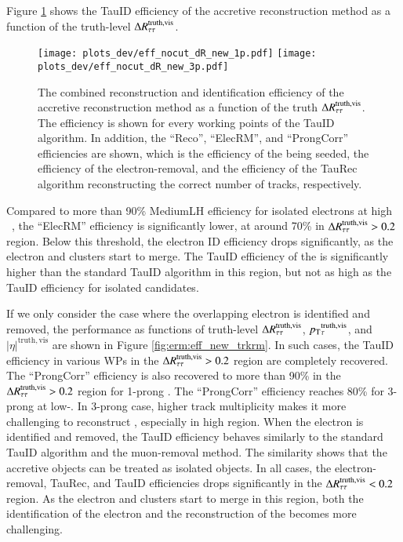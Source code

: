     Figure \ref{fig:erm:eff_dR_erm} shows the TauID efficiency of the accretive \tauhaderm reconstruction method as a function of the truth-level $\Delta R_\mathrm{\tau\tau}^\mathrm{truth, vis}$.
    \begin{figure}[htbp]
        \centering
        \texttt{[image: plots\_dev/eff\_nocut\_dR\_new\_1p.pdf]}
        \texttt{[image: plots\_dev/eff\_nocut\_dR\_new\_3p.pdf]}
        \caption{The combined reconstruction and identification efficiency of the accretive \tauhaderm reconstruction method as a function of the truth $\Delta R_\mathrm{\tau\tau}^\mathrm{truth, vis}$. The
        efficiency is shown for every working points of the TauID algorithm. In addition, the ``Reco'', ``ElecRM'', and ``ProngCorr'' efficiencies are shown, which is the efficiency of the
        \tauhad being seeded, the efficiency of the electron-removal, and the efficiency of the TauRec algorithm reconstructing the correct number of tracks, respectively.}
        \label{fig:erm:eff_dR_erm}
    \end{figure}
    Compared to more than 90\% MediumLH efficiency for isolated electrons at high \pT~\cite{EGAM-2021-01}, 
    the ``ElecRM'' efficiency is significantly lower, at around 70\% in $\Delta R_\mathrm{\tau\tau}^\mathrm{truth, vis} > 0.2$ region. 
    Below this threshold, the electron ID efficiency drops significantly, as the electron and \tauhad clusters start to merge. 
    The TauID efficiency of the \tauhaderm is significantly 
    higher than the standard TauID algorithm in this region,
    but not as high as the TauID efficiency for isolated \tauhad candidates.

    If we only consider the case where the overlapping electron is identified and removed, the performance as functions of truth-level 
    $\Delta R_\mathrm{\tau\tau}^\mathrm{truth, vis}$, $p_{\text{T}}{}_{\tau}^\mathrm{truth,vis}$, and $|\eta|^\mathrm{truth, vis}$ are shown in 
    Figure \ref{fig:erm:eff_new_trkrm}.
    In such cases, the TauID efficiency in various WPs in the $\Delta R_\mathrm{\tau\tau}^\mathrm{truth, vis} > 0.2$ 
    region are completely recovered.
    The ``ProngCorr'' efficiency is also recovered to more than 90\% in the $\Delta R_\mathrm{\tau\tau}^\mathrm{truth, vis} > 0.2$ 
    region for 1-prong \tauhaderm.
    The ``ProngCorr'' efficiency reaches 80\% for 3-prong \tauhaderm at low-\pT. 
    In 3-prong case, higher track multiplicity makes it more challenging to reconstruct \tauhad, especially in high \pT region.
    When the electron is identified and removed, the TauID efficiency
    behaves similarly to the standard TauID algorithm and the muon-removal method. 
    The similarity shows that the accretive \tauhaderm 
    objects can be treated as isolated \tauhad objects.
    In all cases, the electron-removal, TauRec, and TauID efficiencies drops significantly in 
    the $\Delta R_\mathrm{\tau\tau}^\mathrm{truth, vis} < 0.2$ region. As the electron and \tauhad clusters start to merge in this region, 
    both the identification of the electron and the reconstruction of the \tauhad becomes more challenging.

